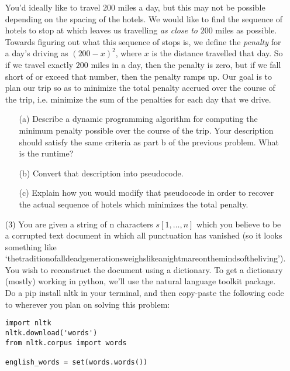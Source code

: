 \documentclass[12pt]{article}
\begin{document}
\begin{enumerate}
    You'd ideally like to travel $200$ miles a day, but this may not be possible depending on the spacing of the hotels. We would like to find the sequence of hotels to stop at which leaves us travelling \emph{as close to} $200$ miles as possible. Towards figuring out what this sequence of stops is, we define the \emph{penalty} for a day's driving as $(200-x)^2$, where $x$ is the distance travelled that day. So if we travel exactly $200$ miles in a day, then the penalty is zero, but if we fall short of or exceed that number, then the penalty ramps up. Our goal is to plan our trip so as to minimize the total penalty accrued over the course of the trip, i.e. minimize the sum of the penalties for each day that we drive.
    \begin{itemize}
        \item[(a)] Describe a dynamic programming algorithm for computing the minimum penalty possible over the course of the trip. Your description should satisfy the same criteria as part b of the previous problem. What is the runtime?
        \item[(b)] Convert that description into pseudocode. 
        \item[(c)] Explain how you would modify that pseudocode in order to recover the actual sequence of hotels which minimizes the total penalty.  
    \end{itemize} 
    \item[(3)] You are given a string of n characters $s[1,\ldots,n]$ which you believe to be a corrupted text document in which all punctuation has vanished (so it looks something like `thetraditionofalldeadgenerationsweighslikeanightmareonthemindsoftheliving'). You wish to reconstruct the document using a dictionary. To get a dictionary (mostly) working in python, we'll use the natural language toolkit package. Do a pip install nltk in your terminal, and then copy-paste the following code to wherever you plan on solving this problem: 
    \begin{verbatim}
import nltk
nltk.download('words')
from nltk.corpus import words

english_words = set(words.words())


\end{verbatim}
\end{enumerate}
\end{document}
